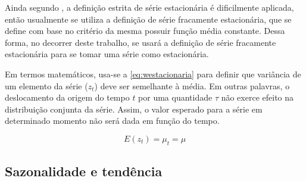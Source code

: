 \documentclass[
    12pt,
    oneside,
    a4paper,
    english,
    brazil
]{abntex2}
\begin{document}
Ainda segundo , a definição  estrita de série estacionária é
dificilmente  aplicada,  então  usualmente  se utiliza  a  definição  de  série
fracamente estacionária,  que se define com  base no critério da  mesma possuir
função média  constante. Dessa forma,  no decorrer  deste trabalho, se  usará a
definição  de  série fracamente  estacionária  para  se  tomar uma  série  como
estacionária.

Em  termos matemáticos,  usa-se a  \autoref{eq:westacionaria} para  definir que
variância  de um  elemento da  série ($z_t$)  deve ser  semelhante à  média. Em
outras  palavras, o  deslocamento da  origem do  tempo $t$  por uma  quantidade
$\tau$ não  exerce efeito  na distribuição  conjunta da  série. Assim,  o valor
esperado para a série em determinado momento não será dada em função do tempo.

\begin{equation}
    \label{eq:westacionaria}
    E(z_t) = \mu_t = \mu
\end{equation}







\subsection{Sazonalidade e tendência}
\end{document}
